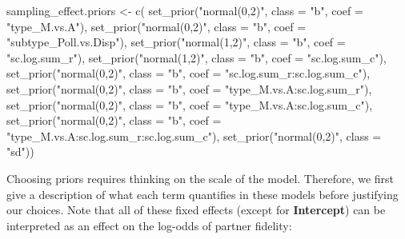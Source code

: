 \documentclass[11pt,]{article}
\newenvironment{Shaded}{}{}
\newcommand{\KeywordTok}[1]{\textcolor[rgb]{0.00,0.00,1.00}{#1}}
\newcommand{\DataTypeTok}[1]{#1}
\newcommand{\StringTok}[1]{\textcolor[rgb]{0.00,0.50,0.50}{#1}}
\newcommand{\NormalTok}[1]{#1}
\begin{document}
\begin{Shaded}
\begin{Highlighting}[]
\NormalTok{sampling_effect.priors <-}\StringTok{ }\KeywordTok{c}\NormalTok{(}
  \KeywordTok{set_prior}\NormalTok{(}\StringTok{"normal(0,2)"}\NormalTok{, }\DataTypeTok{class =} \StringTok{"b"}\NormalTok{, }\DataTypeTok{coef =} \StringTok{"type_M.vs.A"}\NormalTok{),}
  \KeywordTok{set_prior}\NormalTok{(}\StringTok{"normal(0,2)"}\NormalTok{, }\DataTypeTok{class =} \StringTok{"b"}\NormalTok{, }\DataTypeTok{coef =} \StringTok{"subtype_Poll.vs.Disp"}\NormalTok{),}
  \KeywordTok{set_prior}\NormalTok{(}\StringTok{"normal(1,2)"}\NormalTok{, }\DataTypeTok{class =} \StringTok{"b"}\NormalTok{, }\DataTypeTok{coef =} \StringTok{"sc.log.sum_r"}\NormalTok{),}
  \KeywordTok{set_prior}\NormalTok{(}\StringTok{"normal(1,2)"}\NormalTok{, }\DataTypeTok{class =} \StringTok{"b"}\NormalTok{, }\DataTypeTok{coef =} \StringTok{"sc.log.sum_c"}\NormalTok{),}
  \KeywordTok{set_prior}\NormalTok{(}\StringTok{"normal(0,2)"}\NormalTok{, }\DataTypeTok{class =} \StringTok{"b"}\NormalTok{, }\DataTypeTok{coef =} \StringTok{"sc.log.sum_r:sc.log.sum_c"}\NormalTok{),}
  \KeywordTok{set_prior}\NormalTok{(}\StringTok{"normal(0,2)"}\NormalTok{, }\DataTypeTok{class =} \StringTok{"b"}\NormalTok{, }\DataTypeTok{coef =} \StringTok{"type_M.vs.A:sc.log.sum_r"}\NormalTok{),}
  \KeywordTok{set_prior}\NormalTok{(}\StringTok{"normal(0,2)"}\NormalTok{, }\DataTypeTok{class =} \StringTok{"b"}\NormalTok{, }\DataTypeTok{coef =} \StringTok{"type_M.vs.A:sc.log.sum_c"}\NormalTok{),}
  \KeywordTok{set_prior}\NormalTok{(}\StringTok{"normal(0,2)"}\NormalTok{, }\DataTypeTok{class =} \StringTok{"b"}\NormalTok{, }\DataTypeTok{coef =} \StringTok{"type_M.vs.A:sc.log.sum_r:sc.log.sum_c"}\NormalTok{),}
  \KeywordTok{set_prior}\NormalTok{(}\StringTok{"normal(0,2)"}\NormalTok{, }\DataTypeTok{class =} \StringTok{"sd"}\NormalTok{))}
\end{Highlighting}
\end{Shaded}

Choosing priors requires thinking on the scale of the model. Therefore,
we first give a description of what each term quantifies in these models
before justifying our choices. Note that all of these fixed effects
(except for \textbf{Intercept}) can be interpreted as an effect on the
log-odds of partner fidelity:
\end{document}
